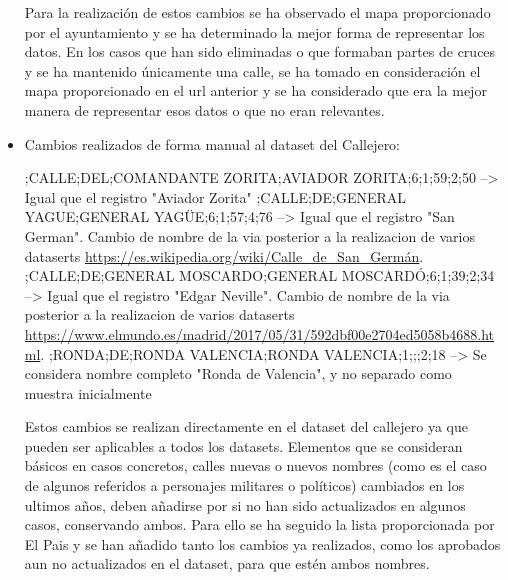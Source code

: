 \begin{itemize}
Para la realización de estos cambios se ha observado el mapa proporcionado por el ayuntamiento \cite{mapa_callejero_klm} y se ha determinado la mejor forma de representar los datos. En los casos que han sido eliminadas o que formaban partes de cruces y se ha mantenido únicamente una calle, se ha tomado en consideración el mapa proporcionado en el url anterior y se ha considerado que era la mejor manera de representar esos datos o que no eran relevantes.









	\item Cambios realizados de forma manual al dataset del Callejero:
\begin{tiny}
;CALLE;DEL;COMANDANTE ZORITA;AVIADOR ZORITA;6;1;59;2;50 --> Igual que el registro "Aviador Zorita"
;CALLE;DE;GENERAL YAGUE;GENERAL YAGÜE;6;1;57;4;76 --> Igual que el registro "San German". Cambio de nombre de la via posterior a la realizacion de varios dataserts \url{https://es.wikipedia.org/wiki/Calle_de_San_Germán}.
;CALLE;DE;GENERAL MOSCARDO;GENERAL MOSCARDÓ;6;1;39;2;34 --> Igual que el registro "Edgar Neville". Cambio de nombre de la via posterior a la realizacion de varios dataserts \url{https://www.elmundo.es/madrid/2017/05/31/592dbf00e2704ed5058b4688.html}.
;RONDA;DE;RONDA VALENCIA;RONDA VALENCIA;1;;;2;18 --> Se considera nombre completo "Ronda de Valencia", y no separado como muestra inicialmente
\end{tiny}

Estos cambios se realizan directamente en el dataset del callejero ya que pueden ser aplicables a todos los datasets. Elementos que se consideran básicos en casos concretos, calles nuevas o nuevos nombres (como es el caso de algunos referidos a personajes militares o políticos) cambiados en los ultimos años, deben añadirse por si no han sido actualizados en algunos casos, conservando ambos.\newline
Para ello se ha seguido la lista proporcionada por El Pais \cite{calles_cambioNombre_elPais} y se han añadido tanto los cambios ya realizados, como los aprobados aun no actualizados en el dataset, para que estén ambos nombres.


\end{itemize}
